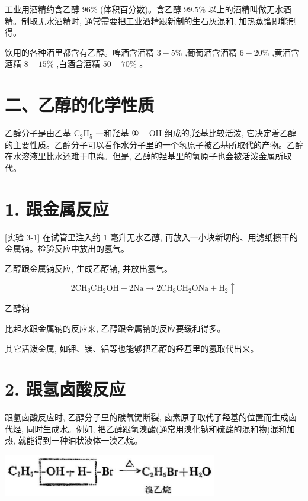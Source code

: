 \documentclass[10pt]{article}
\newcommand{\customfootnote}[1]{
  \let\thefootnote\relax\footnotetext{#1}
}
\begin{document}
工业用酒精约含乙醇 \({96}\%\) (体积百分数)。含乙醇 \({99.5}\%\) 以上的酒精叫做无水酒精。制取无水酒精时, 通常需要把工业酒精跟新制的生石灰混和, 加热蒸馏即能制得。

饮用的各种酒里都含有乙醇。啤酒含酒精 \(3 - 5\%\) ,葡萄酒含酒精 \(6 - {20}\%\) ,黄酒含酒精 \(8 - {15}\%\) ,白酒含酒精 \({50} - {70}\%\) 。

\section*{二、乙醇的化学性质}

乙醇分子是由乙基 \({\mathrm{C}}_{2}{\mathrm{H}}_{5}\) 一和羟基 \(\text{①} - \mathrm{{OH}}\) 组成的,羟基比较活泼, 它决定着乙醇的主要性质。乙醇分子可以看作水分子里的一个氢原子被乙基所取代的产物。乙醇在水溶液里比水还难于电离。但是, 乙醇的羟基里的氢原子也会被活泼金属所取代。

\section*{1. 跟金属反应}

[实验 3-1] 在试管里注入约 1 毫升无水乙醇, 再放入一小块新切的、用滤纸擦干的金属钠。检验反应中放出的氢气。

乙醇跟金属钠反应, 生成乙醇钠, 并放出氢气。

\[
2{\mathrm{{CH}}}_{3}{\mathrm{{CH}}}_{2}\mathrm{{OH}} + 2\mathrm{{Na}} \rightarrow 2{\mathrm{{CH}}}_{3}{\mathrm{{CH}}}_{2}\mathrm{{ONa}} + {\mathrm{H}}_{2} \uparrow
\]

乙醇钠

比起水跟金属钠的反应来, 乙醇跟金属钠的反应要缓和得多。

其它活泼金属, 如钾、镁、铝等也能够把乙醇的羟基里的氢取代出来。

\section*{2. 跟氢卤酸反应}

跟氢卤酸反应时, 乙醇分子里的碳氧键断裂, 卤素原子取代了羟基的位置而生成卤代烃, 同时生成水。例如, 把乙醇跟氢溴酸(通常用溴化钠和硫酸的混和物)混和加热, 就能得到一种油状液体一溴乙烷。

\customfootnote{

① 羟音 qiang。

}

\begin{center}
\includegraphics[max width=0.7\textwidth]{images/01912d16-be99-77bb-9535-4f3ed8d9946f_116_609867.jpg}
\end{center}
\end{document}
